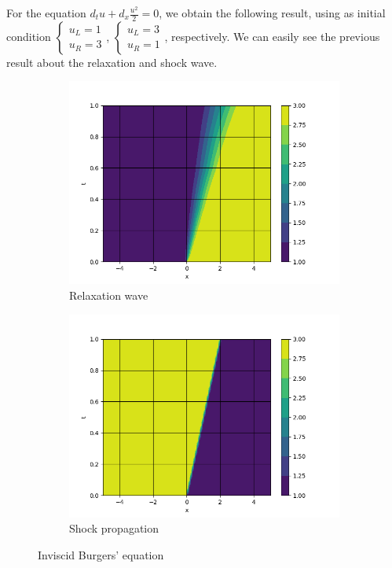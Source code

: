         For the equation $d_tu+d_x\frac{u^2}{2}=0 $, we obtain the following result, using as initial condition $\begin{cases}u_L = 1\\ u_R =3 \end{cases}$, $\begin{cases}u_L = 3\\ u_R =1 \end{cases}$, respectively. We can easily see the previous result about the relaxation and shock wave.
        
        \begin{figure}[h]
            \centering
            \begin{subfigure}{.5\textwidth}
                \centering
                \includegraphics[width=1.1\linewidth]{Burgers13.png}
                \caption{Relaxation wave}
                \label{fig:sub1}
            \end{subfigure}%
            \begin{subfigure}{.5\textwidth}
                \centering
                \includegraphics[width=1.1\linewidth]{Burgers31.png}
                \caption{Shock propagation}
                \label{fig:sub2}
            \end{subfigure}
            \caption{Inviscid Burgers' equation}
        \end{figure}
    


